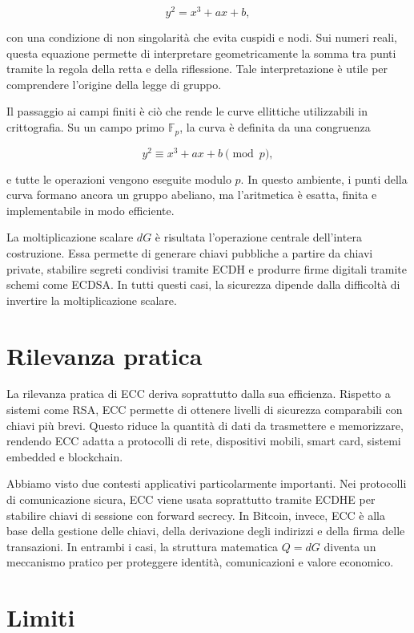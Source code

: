 \documentclass[12pt,a4paper,oneside]{report}
\begin{document}
\[
y^2 = x^3 + ax + b,
\]

con una condizione di non singolarità che evita cuspidi e nodi. Sui numeri reali, questa equazione permette di interpretare geometricamente la somma tra punti tramite la regola della retta e della riflessione. Tale interpretazione è utile per comprendere l'origine della legge di gruppo.

Il passaggio ai campi finiti è ciò che rende le curve ellittiche utilizzabili in crittografia. Su un campo primo \(\mathbb{F}_p\), la curva è definita da una congruenza

\[
y^2 \equiv x^3 + ax + b \pmod p,
\]

e tutte le operazioni vengono eseguite modulo \(p\). In questo ambiente, i punti della curva formano ancora un gruppo abeliano, ma l'aritmetica è esatta, finita e implementabile in modo efficiente.

La moltiplicazione scalare \(dG\) è risultata l'operazione centrale dell'intera costruzione. Essa permette di generare chiavi pubbliche a partire da chiavi private, stabilire segreti condivisi tramite ECDH e produrre firme digitali tramite schemi come ECDSA. In tutti questi casi, la sicurezza dipende dalla difficoltà di invertire la moltiplicazione scalare.

\section{Rilevanza pratica}

La rilevanza pratica di ECC deriva soprattutto dalla sua efficienza. Rispetto a sistemi come RSA, ECC permette di ottenere livelli di sicurezza comparabili con chiavi più brevi. Questo riduce la quantità di dati da trasmettere e memorizzare, rendendo ECC adatta a protocolli di rete, dispositivi mobili, smart card, sistemi embedded e blockchain.

Abbiamo visto due contesti applicativi particolarmente importanti. Nei protocolli di comunicazione sicura, ECC viene usata soprattutto tramite ECDHE per stabilire chiavi di sessione con forward secrecy. In Bitcoin, invece, ECC è alla base della gestione delle chiavi, della derivazione degli indirizzi e della firma delle transazioni. In entrambi i casi, la struttura matematica \(Q=dG\) diventa un meccanismo pratico per proteggere identità, comunicazioni e valore economico.

\section{Limiti}
\end{document}
